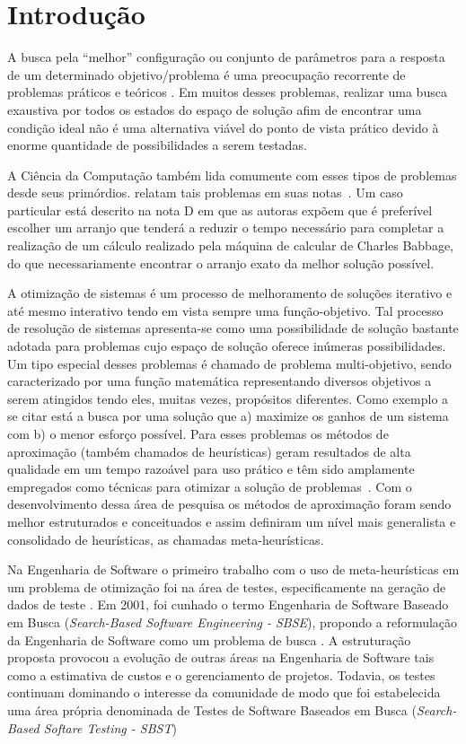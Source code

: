 \chapter[Introdução]{Introdução}

A busca pela ``melhor'' configuração ou conjunto de parâmetros para a resposta de um determinado objetivo/problema é uma preocupação recorrente de problemas práticos e teóricos \cite{combinatorialoptimization1998}. Em muitos desses problemas, realizar uma busca exaustiva por todos os estados do espaço de solução afim de encontrar uma condição ideal não é uma alternativa viável do ponto de vista prático devido à enorme quantidade de possibilidades a serem testadas. 

A Ciência da Computação também lida comumente com esses tipos de problemas desde seus primórdios.  relatam tais problemas em suas notas~\cite{menabrea1842sketch}. Um caso particular está descrito na nota D em que as autoras expõem que é preferível escolher um arranjo que tenderá a reduzir o tempo necessário para completar a realização de um cálculo realizado pela máquina de calcular de Charles Babbage, do que necessariamente encontrar o arranjo exato da melhor solução possível\cite{menabrea1842sketch}.

A otimização de sistemas é um processo de melhoramento de soluções iterativo e até mesmo interativo tendo em vista sempre uma função-objetivo. Tal processo de resolução de sistemas apresenta-se como uma possibilidade de solução bastante adotada para problemas cujo espaço de solução oferece inúmeras possibilidades. Um tipo especial desses problemas é chamado de problema multi-objetivo, sendo caracterizado por uma função matemática representando diversos objetivos a serem atingidos tendo eles, muitas vezes, propósitos diferentes. Como exemplo a se citar está a busca por uma solução que a) maximize os ganhos de um sistema  com b) o menor esforço possível.  Para esses problemas os métodos de aproximação (também chamados de heurísticas) geram resultados de alta qualidade em um tempo razoável para uso prático e têm sido amplamente empregados como técnicas para otimizar a solução de problemas~\cite{gendreau2005metaheuristics}. Com o desenvolvimento dessa área de pesquisa os métodos de aproximação foram sendo melhor estruturados e conceituados e assim definiram um nível mais generalista e consolidado de heurísticas, as chamadas meta-heurísticas.

Na Engenharia de Software o primeiro trabalho com o uso de meta-heurísticas em um problema de otimização foi na área de testes, especificamente na geração de dados de teste \cite{miller1976automatic}. Em 2001, foi cunhado o termo Engenharia de Software Baseado em Busca (\textit{Search-Based Software Engineering - SBSE}), propondo a reformulação da Engenharia de Software como um problema de busca \cite{harman2001search}. A estruturação proposta provocou a evolução de outras áreas na Engenharia de Software tais como a estimativa de custos e o gerenciamento de projetos. Todavia, os testes continuam dominando o interesse da comunidade de modo que foi estabelecida  uma área própria denominada de Testes de Software Baseados em Busca (\textit{Search-Based Softare Testing - SBST}) \cite{harman2012search}

